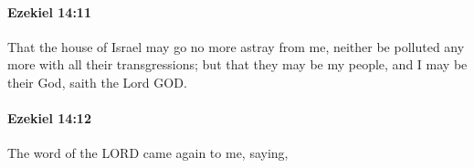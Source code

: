 		\paragraph{Ezekiel 14:11} %
			\label{EZEKIEL-14-11}

			That the house of Israel may go no more astray from me, neither be polluted any more with all their transgressions; but that they may be my people, and I may be their God, saith the Lord GOD.


		\paragraph{Ezekiel 14:12} %
			\label{EZEKIEL-14-12}

			The word of the LORD came again to me, saying,


